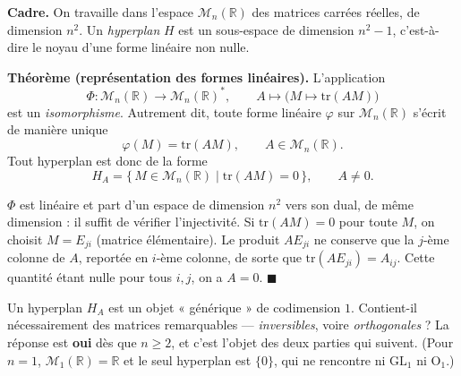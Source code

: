 


\begin{tcolorbox}[thmbox]
  \textbf{Cadre.}\enspace%
  On travaille dans l'espace $\mathcal{M}_n(\mathbb{R})$ des matrices carrées
  réelles, de dimension $n^2$. Un \emph{hyperplan} $H$ est un sous-espace de
  dimension $n^2 - 1$, c'est-à-dire le noyau d'une forme linéaire non nulle.

  \medskip
  \textbf{Théorème (représentation des formes linéaires).}\enspace%
  L'application
  \[
    \Phi : \mathcal{M}_n(\mathbb{R}) \longrightarrow \mathcal{M}_n(\mathbb{R})^*,
    \qquad A \longmapsto \bigl(M \mapsto \mathrm{tr}(AM)\bigr)
  \]
  est un \emph{isomorphisme}. Autrement dit, toute forme linéaire
  $\varphi$ sur $\mathcal{M}_n(\mathbb{R})$ s'écrit de manière unique
  \[
    \varphi(M) = \mathrm{tr}(AM), \qquad A \in \mathcal{M}_n(\mathbb{R}).
  \]
  Tout hyperplan est donc de la forme
  \[
    H_A = \{\,M \in \mathcal{M}_n(\mathbb{R}) \mid \mathrm{tr}(AM) = 0\,\},
    \qquad A \neq 0.
  \]
\end{tcolorbox}

\begin{mdframed}[style=proofbar]
  $\Phi$ est linéaire et part d'un espace de dimension $n^2$ vers son dual,
  de même dimension : il suffit de vérifier l'injectivité. Si $\mathrm{tr}(AM)=0$
  pour toute $M$, on choisit $M = E_{ji}$ (matrice élémentaire). Le produit
  $A E_{ji}$ ne conserve que la $j$-ème colonne de $A$, reportée en $i$-ème
  colonne, de sorte que $\mathrm{tr}(AE_{ji}) = A_{ij}$. Cette quantité étant
  nulle pour tous $i,j$, on a $A = 0$. \hfill$\blacksquare$
\end{mdframed}

Un hyperplan $H_A$ est un objet « générique » de codimension $1$. Contient-il
nécessairement des matrices remarquables — \emph{inversibles}, voire
\emph{orthogonales} ? La réponse est \textbf{oui} dès que $n \geq 2$, et c'est
l'objet des deux parties qui suivent. (Pour $n=1$, $\mathcal{M}_1(\mathbb{R})=\mathbb{R}$
et le seul hyperplan est $\{0\}$, qui ne rencontre ni $\mathrm{GL}_1$ ni $\mathrm{O}_1$.)

